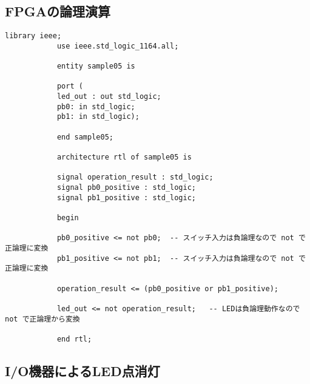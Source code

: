 \documentclass{ltjsarticle}
\begin{document}
	\subsection{FPGAの論理演算}

		\begin{lstlisting}[caption=sample5, label=sample5]
			library ieee;
			use ieee.std_logic_1164.all;

			entity sample05 is

			port (
			led_out : out std_logic;
			pb0: in std_logic;
			pb1: in std_logic);

			end sample05;

			architecture rtl of sample05 is

			signal operation_result : std_logic;
			signal pb0_positive : std_logic;
			signal pb1_positive : std_logic;

			begin

			pb0_positive <= not pb0;  -- スイッチ入力は負論理なので not で正論理に変換
			pb1_positive <= not pb1;  -- スイッチ入力は負論理なので not で正論理に変換

			operation_result <= (pb0_positive or pb1_positive);

			led_out <= not operation_result;   -- LEDは負論理動作なので not で正論理から変換

			end rtl;
		\end{lstlisting}

	\subsection{I/O機器によるLED点消灯}
\end{document}
